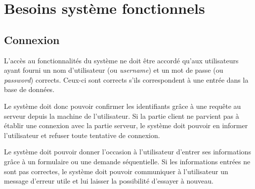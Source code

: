 \section{Besoins système fonctionnels}
\subsection{Connexion}

L'accès au fonctionnalités du système ne doit être accordé
qu'aux utilisateurs ayant fourni un nom d'utilisateur (ou
\emph{username}) et un mot de passe (ou \emph{password})
corrects. Ceux-ci sont corrects s'ils correspondent
 à une entrée dans la base de données.

Le système doit donc pouvoir confirmer les identifiants
grâce à une requête au serveur depuis
la machine de l'utilisateur.
Si la partie client ne parvient pas à établir une connexion
avec la partie serveur,
le système doit pouvoir en informer
l'utilisateur et refuser toute tentative de connexion.

Le système doit pouvoir donner l'occasion à l'utilisateur d'entrer
ses informations grâce à un formulaire ou une demande
séquentielle. Si les informations entrées ne sont pas
correctes, le système doit pouvoir communiquer à
l'utilisateur un message d'erreur utile et lui laisser la
possibilité d'essayer à nouveau.







